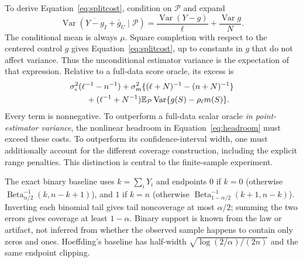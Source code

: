 \documentclass{article}
\newcommand{\E}{\mathbb E}
\newcommand{\Var}{\operatorname{Var}}
\begin{document}
To derive Equation~\eqref{eq:splitcost}, condition on $\mathcal P$ and expand
\begin{equation}
 \Var(\overline{Y-g}_I+\bar g_U\mid\mathcal P)
 =\frac{\Var(Y-g)}\ell+\frac{\Var g}N.
 \label{eq:pilotvar}
\end{equation}
The conditional mean is always $\mu$. Square completion with respect to the centered control $g$ gives Equation~\eqref{eq:splitcost}, up to constants in $g$ that do not affect variance. Thus the unconditional estimator variance is the expectation of that expression. Relative to a full-data score oracle, its excess is
\begin{align}
 &\sigma_\epsilon^2(\ell^{-1}-n^{-1})
 +\sigma_m^2\{(\ell+N)^{-1}-(n+N)^{-1}\}\notag\\
 &\qquad +(\ell^{-1}+N^{-1})\E_{\mathcal P}\Var\{g(S)-\rho_\ell m(S)\}.
 \label{eq:costs}
\end{align}
Every term is nonnegative. To outperform a full-data scalar oracle \emph{in point-estimator variance}, the nonlinear headroom in Equation~\eqref{eq:headroom} must exceed these costs. To outperform its confidence-interval width, one must additionally account for the different coverage construction, including the explicit range penalties. This distinction is central to the finite-sample experiment.

The exact binary baseline uses $k=\sum_iY_i$ and endpoints $0$ if $k=0$ (otherwise $\operatorname{Beta}^{-1}_{\alpha/2}(k,n-k+1)$), and $1$ if $k=n$ (otherwise $\operatorname{Beta}^{-1}_{1-\alpha/2}(k+1,n-k)$). Inverting each binomial tail gives tail noncoverage at most $\alpha/2$; summing the two errors gives coverage at least $1-\alpha$. Binary support is known from the law or artifact, not inferred from whether the observed sample happens to contain only zeros and ones. Hoeffding's baseline has half-width $\sqrt{\log(2/\alpha)/(2n)}$ and the same endpoint clipping.

\clearpage
\end{document}
